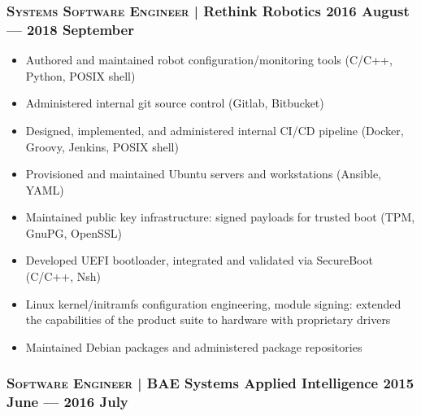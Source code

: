 \documentclass[letterpaper,10pt]{article}
\begin{document}

\subsubsection*{\textsc{Systems Software Engineer} | Rethink Robotics \hfill 2016 August --- 2018 September}

\begin{itemize}

\item
  Authored and maintained robot configuration/monitoring tools (C/C++, Python,
  POSIX shell)
\item
  Administered internal git source control (Gitlab, Bitbucket)
\item
  Designed, implemented, and administered internal CI/CD pipeline (Docker,
  Groovy, Jenkins, POSIX shell)
\item
  Provisioned and maintained Ubuntu servers and workstations (Ansible, YAML)
\item
  Maintained public key infrastructure: signed payloads for trusted boot (TPM,
  GnuPG, OpenSSL)
\item
  Developed UEFI bootloader, integrated and validated via SecureBoot (C/C++,
  Nsh)
\item
  Linux kernel/initramfs configuration engineering, module signing: extended
  the capabilities of the product suite to hardware with proprietary drivers
\item
  Maintained Debian packages and administered package repositories

\end{itemize}



\subsubsection*{\textsc{Software Engineer} | BAE Systems Applied Intelligence \hfill 2015 June --- 2016 July}
\end{document}
